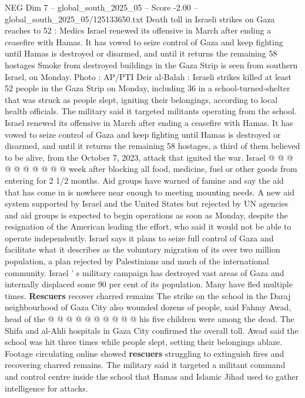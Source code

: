\begin{textsample}{NEG Dim 7 – global\_south\_2025\_05 – Score -2.00 – global\_south\_2025\_05/125133650.txt}  \label{ex:f7_neg_011}
Death toll in Israeli strikes on Gaza reaches to 52 : Medics Israel renewed its offensive in March after ending a ceasefire with Hamas.
It has vowed to seize control of Gaza and keep fighting until Hamas is destroyed or disarmed, and until it returns the remaining 58 hostages Smoke from destroyed buildings in the Gaza Strip is seen from southern Israel, on Monday.
Photo : AP/PTI Deir al-Balah : Israeli strikes killed at least 52 people in the Gaza Strip on Monday, including 36 in a school-turned-shelter that was struck as people slept, igniting their belongings, according to local health officials.
The military said it targeted militants operating from the school.
Israel renewed its offensive in March after ending a ceasefire with Hamas.
It has vowed to seize control of Gaza and keep fighting until Hamas is destroyed or disarmed, and until it returns the remaining 58 hostages, a third of them believed to be alive, from the October 7, 2023, attack that ignited the war.
Israel @ @ @ @ @ @ @ @ @ @ week after blocking all food, medicine, fuel or other goods from entering for 2 1/2 months.
Aid groups have warned of famine and say the aid that has come in is nowhere near enough to meeting mounting needs.
A new aid system supported by Israel and the United States but rejected by UN agencies and aid groups is expected to begin operations as soon as Monday, despite the resignation of the American leading the effort, who said it would not be able to operate independently.
Israel says it plans to seize full control of Gaza and facilitate what it describes as the voluntary migration of its over two million population, a plan rejected by Palestinians and much of the international community.
Israel ' s military campaign has destroyed vast areas of Gaza and internally displaced some 90 per cent of its population.
Many have fled multiple times. \textbf{Rescuers} recover charred remains The strike on the school in the Daraj neighbourhood of Gaza City also wounded dozens of people, said Fahmy Awad, head of the @ @ @ @ @ @ @ @ @ @ his five children were among the dead.
The Shifa and al-Ahli hospitals in Gaza City confirmed the overall toll.
Awad said the school was hit three times while people slept, setting their belongings ablaze.
Footage circulating online showed \textbf{rescuers} struggling to extinguish fires and recovering charred remains.
The military said it targeted a militant command and control centre inside the school that Hamas and Islamic Jihad used to gather intelligence for attacks.

\end{textsample}
